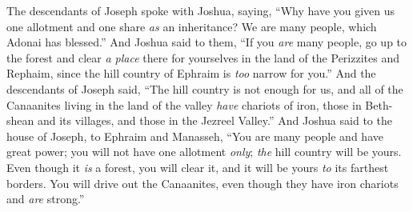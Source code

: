 \begin{biblechapter}
 The descendants of Joseph spoke with Joshua, saying, “Why have you given us one allotment and one share \textit{as} an inheritance? We are many people, which Adonai has blessed.”
\verse And Joshua said to them, “If you \textit{are} many people, go up to the forest and clear \textit{a place} there for yourselves in the land of the Perizzites and Rephaim, since the hill country of Ephraim is \textit{too} narrow for you.”
\verse And the descendants of Joseph said, “The hill country is not enough for us, and all of the Canaanites living in the land of the valley \textit{have} chariots of iron, those in Beth-shean and its villages, and those in the Jezreel Valley.”
\verse And Joshua said to the house of Joseph, to Ephraim and Manasseh, “You are many people and have great power; you will not have one allotment \textit{only};
\verse \textit{the} hill country will be yours. Even though it \textit{is} a forest, you will clear it, and it will be yours \textit{to} its farthest borders. You will drive out the Canaanites, even though they have iron chariots and \textit{are} strong.”
\end{biblechapter}

